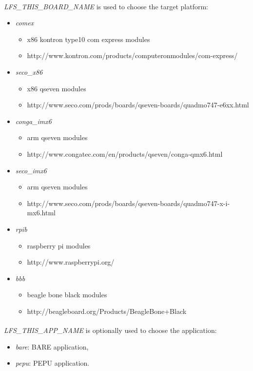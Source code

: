 \documentclass[a4paper, 11pt]{article}
\begin{document}
\paragraph{}
\textit{LFS\_THIS\_BOARD\_NAME} is used to choose the target platform:
\begin{itemize}
\item \textit{comex}
 \begin{itemize}
 \item x86 kontron type10 com express modules
 \item http://www.kontron.com/products/computeronmodules/com-express/
 \end{itemize}
\item \textit{seco\_x86}
 \begin{itemize}
 \item x86 qseven modules
 \item http://www.seco.com/prods/boards/qseven-boards/quadmo747-e6xx.html
 \end{itemize}
\item \textit{conga\_imx6}
 \begin{itemize}
 \item arm qseven modules
 \item http://www.congatec.com/en/products/qseven/conga-qmx6.html
 \end{itemize}
\item \textit{seco\_imx6}
 \begin{itemize}
 \item arm qseven modules
 \item http://www.seco.com/prods/boards/qseven-boards/quadmo747-x-i-mx6.html
 \end{itemize}
\item \textit{rpib}
 \begin{itemize}
 \item raspberry pi modules
 \item http://www.raspberrypi.org/
 \end{itemize}
\item \textit{bbb}
 \begin{itemize}
 \item beagle bone black modules
 \item http://beagleboard.org/Products/BeagleBone+Black
 \end{itemize}
\end{itemize}

\paragraph{}
\textit{LFS\_THIS\_APP\_NAME} is optionally used to choose the application:
\begin{itemize}
\item \textit{bare}: BARE application,
\item \textit{pepu}: PEPU application.
\end{itemize}
\end{document}
